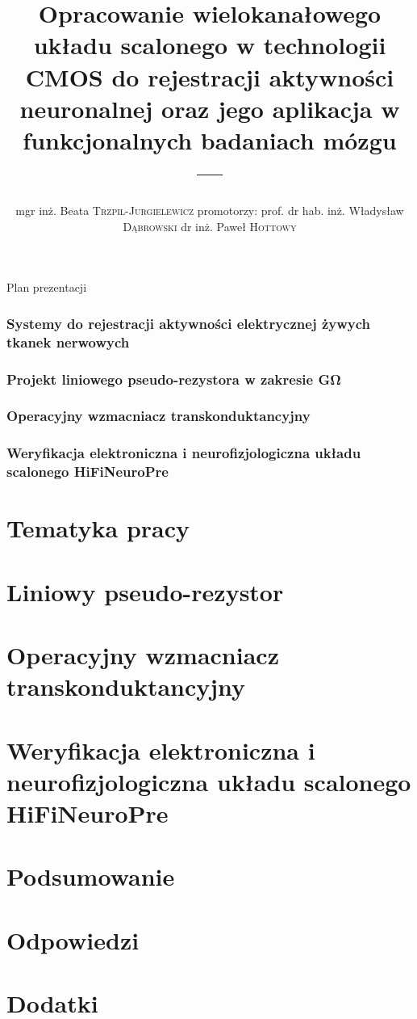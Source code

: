 \documentclass[aspectratio=1610, polish]{beamer}
\author[Beata Trzpil-Jurgielewicz]{mgr inż. Beata \textsc{Trzpil-Jurgielewicz}
\newline 
promotorzy:
\newline
prof. dr hab. inż. Władysław \textsc{Dąbrowski} 
\newline 
dr inż. Paweł \textsc{Hottowy}}
\date{}
\title[]{Opracowanie wielokanałowego układu scalonego w technologii CMOS do rejestracji aktywności neuronalnej oraz jego aplikacja w funkcjonalnych badaniach mózgu
	}
\title{---}
\begin{document}
\maketitle


\begin{frame}{Plan prezentacji}
	\tableofcontents%
\end{frame}
\section{Systemy do rejestracji aktywności elektrycznej żywych tkanek nerwowych}
\section{Projekt liniowego pseudo-rezystora w zakresie \si{\giga\ohm}}
\section{Operacyjny wzmacniacz transkonduktancyjny}
\section{Weryfikacja elektroniczna i neurofizjologiczna układu scalonego HiFiNeuroPre}

\part{Tematyka pracy}


\part{Liniowy pseudo-rezystor}



\part{Operacyjny wzmacniacz transkonduktancyjny}



\part{Weryfikacja elektroniczna i neurofizjologiczna układu scalonego HiFiNeuroPre}

\part{Podsumowanie}

\maketitle

\part{Odpowiedzi}

\maketitle

\part{Dodatki}

\end{document}
